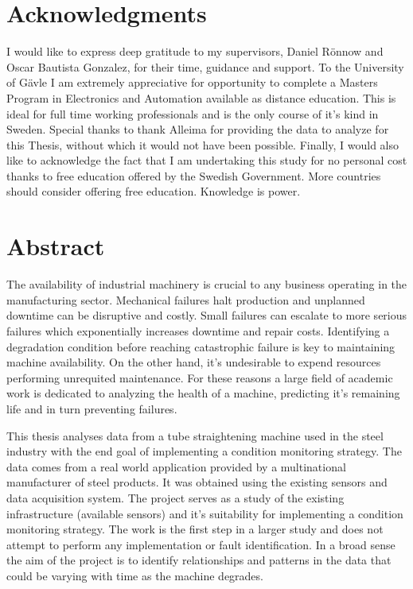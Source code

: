 \documentclass[]{article}
\begin{document}
\setmainfont{Perpetua}

\newpage
\thispagestyle{empty}
\mbox{}
\newpage
{}

\section*{Acknowledgments}
I would like to express deep gratitude to my supervisors, Daniel Rönnow and Oscar Bautista Gonzalez, for their time, guidance and support. To the University of Gävle I am extremely appreciative for opportunity to complete a Masters Program in Electronics and Automation available as distance education. This is ideal for full time working professionals and is the only course of it's kind in Sweden. Special thanks to thank Alleima for providing the data to analyze for this Thesis, without which it would not have been possible. Finally, I would also like to acknowledge the fact that I am undertaking this study for no personal cost thanks to free education offered by the Swedish Government. More countries should consider offering free education. Knowledge is power.
\newpage

\section*{Abstract}
The availability of industrial machinery is crucial to any business operating in the manufacturing sector. Mechanical failures halt production and unplanned downtime can be disruptive and costly. Small failures can escalate to more serious failures which exponentially increases downtime and repair costs. Identifying a degradation condition before reaching catastrophic failure is key to maintaining machine availability. On the other hand, it's undesirable to expend resources performing unrequited maintenance. For these reasons a large field of academic work is dedicated to analyzing the health of a machine, predicting it's remaining life and in turn preventing failures.

This thesis analyses data from a tube straightening machine used in the steel industry with the end goal of implementing a condition monitoring strategy. The data comes from a real world application provided by a multinational manufacturer of steel products. It was obtained using the existing sensors and data acquisition system. The project serves as a study of the existing infrastructure (available sensors) and it's suitability for implementing a condition monitoring strategy. The work is the first step in a larger study and does not attempt to perform any implementation or fault identification. In a broad sense the aim of the project is to identify relationships and patterns in the data that could be varying with time as the machine degrades.
\end{document}
